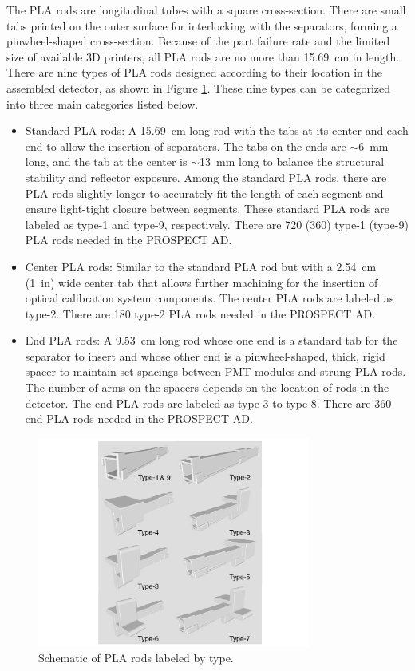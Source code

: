 The PLA rods are longitudinal tubes with a square cross-section.
There are small tabs printed on the outer surface for interlocking with the separators, forming a pinwheel-shaped cross-section.
Because of the part failure rate and the limited size of available 3D printers, all PLA rods are no more than 15.69~cm in length.
There are nine types of PLA rods designed according to their location in the assembled detector, as shown in Figure \ref{fig:pinwheel_types}. 
These nine types can be categorized into three main categories listed below.
\begin{itemize}
	\item Standard PLA rods: A 15.69~cm long rod with the tabs at its center and each end to allow the insertion of separators. 
The tabs on the ends are $\sim$6~mm long, and the tab at the center is $\sim$13~mm long to balance the structural stability and reflector exposure.
Among the standard PLA rods, there are PLA rods slightly longer to accurately fit the length of each segment and ensure light-tight closure between segments.
These standard PLA rods are labeled as type-1 and type-9, respectively.
There are 720 (360) type-1 (type-9) PLA rods needed in the PROSPECT AD.
	\item Center PLA rods: Similar to the standard PLA rod but with a 2.54~cm (1~in) wide center tab that allows further machining for the insertion of optical calibration system components.
The center PLA rods are labeled as type-2.
There are 180 type-2 PLA rods needed in the PROSPECT AD.
	\item End PLA rods: A 9.53~cm long rod whose one end is a standard tab for the separator to insert and whose other end is a pinwheel-shaped, thick, rigid spacer to maintain set spacings between PMT modules and strung PLA rods. The number of arms on the spacers depends on the location of rods in the detector.
The end PLA rods are labeled as type-3 to type-8.
There are 360 end PLA rods needed in the PROSPECT AD.
\end{itemize}

\begin{figure}[h!]
\centering
\includegraphics[width=0.8\textwidth]{Figures/Pinwheel_Types.pdf}
\caption[Schematics of PLA rods]{Schematic of PLA rods labeled by type.}
\label{fig:pinwheel_types}
\end{figure}

